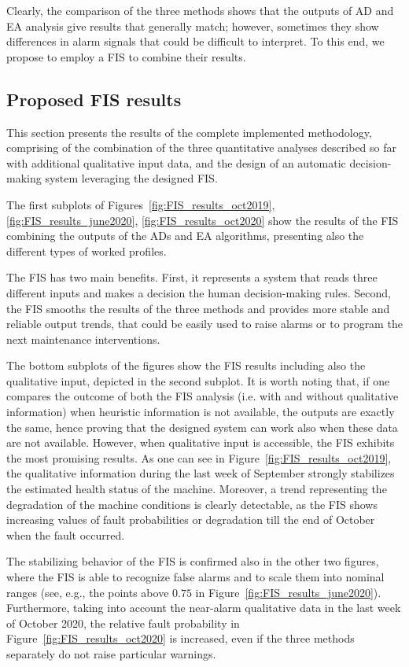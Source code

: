 Clearly, the comparison of the three methods shows that the outputs of  AD and EA analysis give results that generally match; however, sometimes they show differences in alarm signals that could be difficult to interpret. To this end, we propose to employ a FIS to combine their results.


\subsection{Proposed FIS results}\label{sec: qual_results}
This section presents the results of the complete implemented methodology, comprising of the combination of the three quantitative analyses described so far with additional qualitative input data, and the design of an automatic decision-making system leveraging the designed FIS.

The first subplots of Figures~\ref{fig:FIS_results_oct2019}, \ref{fig:FIS_results_june2020}, \ref{fig:FIS_results_oct2020} show the results of the FIS combining the outputs of the ADs and EA algorithms, presenting also the different types of worked profiles.

The FIS has two main benefits. First, it represents a  system that reads three different inputs and makes a decision the human decision-making rules. Second, the FIS smooths the results of the three methods and provides more stable and reliable output trends, that could be easily used to raise alarms or to program the next maintenance interventions.

The bottom subplots of the figures show the FIS results including also the qualitative input, depicted in the second subplot. It is worth noting that, if one compares the outcome of both the FIS analysis (i.e. with and without qualitative information) when heuristic information is not available, the outputs are exactly the same, hence proving that the designed system can work also when these data are not available. However, when qualitative input is {accessible}, the FIS exhibits the most promising results. As one can see in Figure~\ref{fig:FIS_results_oct2019}, the qualitative information during the last week of September strongly stabilizes the estimated health status of the machine. Moreover, a trend representing the degradation of the machine conditions is clearly detectable, as the FIS shows increasing values of fault probabilities or degradation till the end of October when the fault occurred. 

The stabilizing behavior of the FIS is confirmed also in the other two figures, where the FIS is able to recognize false alarms and to scale them into nominal ranges (see, e.g., the points above $0.75$ in Figure~\ref{fig:FIS_results_june2020}). Furthermore, taking into account the near-alarm qualitative data in the last week of October 2020, the relative fault probability in Figure~\ref{fig:FIS_results_oct2020} is increased, even if the three methods separately do not raise particular warnings.



